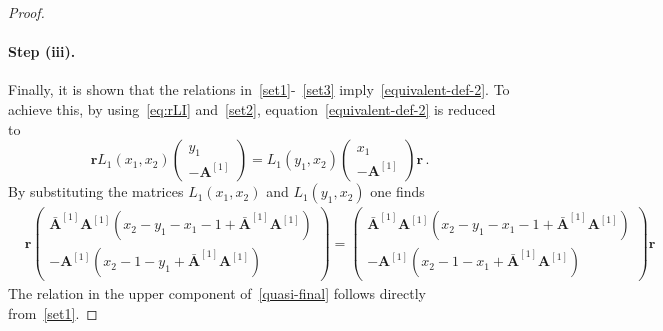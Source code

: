 \documentclass[10pt,a4paper]{amsart}
\newcommand{\OA}{\mathbf{A}}
\newcommand{\OAD}{\mathbf{\bar{A}}}
\begin{document}
\begin{proof}
\paragraph{Step (iii).}  Finally, it is shown that the relations in~\eqref{set1}-~\eqref{set3} imply~\eqref{equivalent-def-2}.
                                  To achieve this, by using~\eqref{eq:rLI} and~\eqref{set2}, equation~\eqref{equivalent-def-2} is reduced to
\begin{equation}\label{eq:relRLv}
	\mathbf{r}L_{1}(x_{1},x_{2})\begin{pmatrix}
		y_{1}\\
		-\OA^{[1]}
	\end{pmatrix}=L_{1}(y_{1},x_{2})\begin{pmatrix}
		x_{1}\\
		-\OA^{[1]}
	\end{pmatrix}\mathbf{r}\,.
\end{equation}
By substituting the matrices $L_{1}(x_{1},x_{2})$ and $L_{1}(y_{1},x_{2})$ one finds
\begin{equation}\label{quasi-final}
	\begin{split}
		&\mathbf{r}
		\begin{pmatrix}
			\OAD^{[1]}\OA^{[1]}\left(x_{2}-y_{1}-x_{1}-1+\OAD^{[1]}\OA^{[1]}\right)\\
				-\OA^{[1]}\left(x_{2}-1-y_{1}+\OAD^{[1]}\OA^{[1]}\right)
            		\end{pmatrix}=
				\begin{pmatrix}
			\OAD^{[1]}\OA^{[1]}\left(x_{2}-y_{1}-x_{1}-1+\OAD^{[1]}\OA^{[1]}\right)\\
			-\OA^{[1]}\left(x_{2}-1-x_{1}+\OAD^{[1]}\OA^{[1]}\right)
            		\end{pmatrix}\mathbf{r}
	\end{split}
\end{equation}
The relation in the upper
component of~\eqref{quasi-final} follows directly from~\eqref{set1}.






\end{proof}
\end{document}

